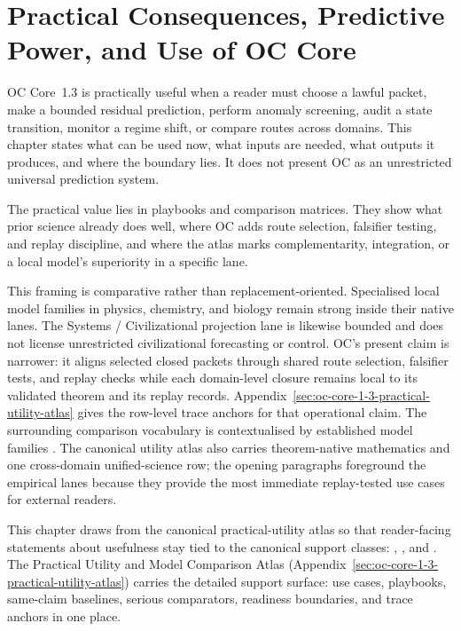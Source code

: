 \section{Practical Consequences, Predictive Power, and Use of OC Core}
\label{sec:oc-core-1-3-practical-utility}

OC Core~1.3 is practically useful when a reader must choose a lawful packet,
make a bounded residual prediction, perform anomaly screening, audit a state
transition, monitor a regime shift, or compare routes across domains. This
chapter states what can be used now, what inputs are needed, what outputs it
produces, and where the boundary lies. It does not present OC as an
unrestricted universal prediction system.

The practical value lies in playbooks and comparison matrices. They show what
prior science already does well, where OC adds route selection, falsifier
testing, and replay discipline, and where the atlas marks complementarity,
integration, or a local model's superiority in a specific lane.

This framing is comparative rather than replacement-oriented. Specialised
local model families in physics, chemistry, and biology remain strong inside
their native lanes. The Systems / Civilizational projection lane is likewise
bounded and does not license unrestricted civilizational forecasting or
control. OC's
present claim is narrower: it aligns selected closed packets through shared
route selection, falsifier tests, and replay checks while each domain-level
closure remains local to its validated theorem and its replay records.
Appendix~\ref{sec:oc-core-1-3-practical-utility-atlas} gives the row-level
trace anchors for that operational claim. The surrounding comparison
vocabulary is contextualised by established model families
\parencite{goldenfeld_lectures,wilson_renormalization,kauffman_autocatalytic,raf_networks,hebb_organization,friston_free_energy}. The
canonical utility atlas also carries theorem-native mathematics and one
cross-domain unified-science row; the opening paragraphs foreground the
empirical lanes because they provide the most immediate replay-tested use cases
for external readers.

This chapter draws from the canonical practical-utility atlas so that
reader-facing statements about usefulness stay tied to the canonical support
classes: ,
, and
. The
Practical Utility and Model Comparison Atlas
(Appendix~\ref{sec:oc-core-1-3-practical-utility-atlas}) carries the detailed
support surface: use cases, playbooks, same-claim baselines, serious
comparators, readiness boundaries, and trace anchors in one place.


